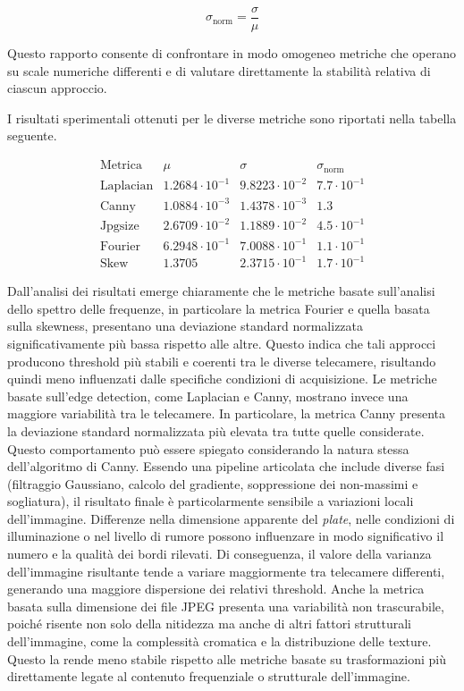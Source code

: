 \documentclass[
    target=bach,
    aauheader=,
    style=
]{thud}
\begin{document}
\begin{equation}
\sigma_{\text{norm}} = \frac{\sigma}{\mu}
\end{equation}

Questo rapporto consente di confrontare in modo omogeneo metriche che operano su scale numeriche differenti e di valutare direttamente la stabilità relativa di ciascun approccio.

I risultati sperimentali ottenuti per le diverse metriche sono riportati nella tabella seguente.

\begin{equation}
\begin{array}{l|l|l|l}
  \text{Metrica} & \mu & \sigma & \sigma_\text{norm} \\
\hline
  \text{Laplacian} & 1.2684 \cdot 10^{-1}  & 9.8223 \cdot 10^{-2}  &  7.7 \cdot 10^{-1} \\
  \text{Canny} & 1.0884 \cdot 10^{-3}  &  1.4378 \cdot 10^{-3}  & 1.3  \\ 
  \text{Jpgsize} & 2.6709 \cdot 10^{-2}  & 1.1889 \cdot 10^{-2}  & 4.5 \cdot 10^{-1} \\
  \text{Fourier} & 6.2948 \cdot 10^{-1}  & 7.0088 \cdot 10^{-1}  & 1.1 \cdot 10^{-1} \\
  \text{Skew} & 1.3705 & 2.3715 \cdot 10 ^{-1} & 1.7 \cdot 10^{-1} 
\end{array}
\end{equation}

Dall'analisi dei risultati emerge chiaramente che le metriche basate sull'analisi dello spettro delle frequenze, in particolare la metrica Fourier e quella basata sulla skewness, presentano una deviazione standard normalizzata significativamente più bassa rispetto alle altre. Questo indica che tali approcci producono threshold più stabili e coerenti tra le diverse telecamere, risultando quindi meno influenzati dalle specifiche condizioni di acquisizione. Le metriche basate sull'edge detection, come Laplacian e Canny, mostrano invece una maggiore variabilità tra le telecamere. In particolare, la metrica Canny presenta la deviazione standard normalizzata più elevata tra tutte quelle considerate. Questo comportamento può essere spiegato considerando la natura stessa dell'algoritmo di Canny. Essendo una pipeline articolata che include diverse fasi (filtraggio Gaussiano, calcolo del gradiente, soppressione dei non-massimi e sogliatura), il risultato finale è particolarmente sensibile a variazioni locali dell'immagine. Differenze nella dimensione apparente del \textit{plate}, nelle condizioni di illuminazione o nel livello di rumore possono influenzare in modo significativo il numero e la qualità dei bordi rilevati. Di conseguenza, il valore della varianza dell'immagine risultante tende a variare maggiormente tra telecamere differenti, generando una maggiore dispersione dei relativi threshold. Anche la metrica basata sulla dimensione dei file JPEG presenta una variabilità non trascurabile, poiché risente non solo della nitidezza ma anche di altri fattori strutturali dell'immagine, come la complessità cromatica e la distribuzione delle texture. Questo la rende meno stabile rispetto alle metriche basate su trasformazioni più direttamente legate al contenuto frequenziale o strutturale dell'immagine.
\end{document}
